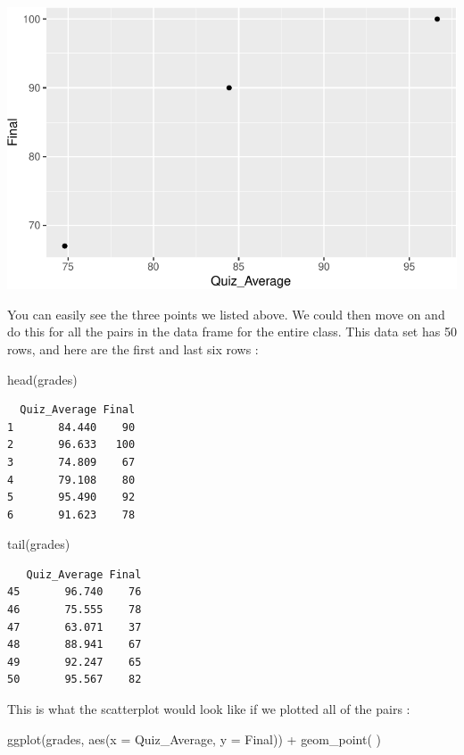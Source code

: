 \documentclass[
  letterpaper,
  DIV=11,
  numbers=noendperiod]{scrreprt}
\newenvironment{Shaded}{\begin{snugshade}}{\end{snugshade}}
\newcommand{\AttributeTok}[1]{\textcolor[rgb]{0.40,0.45,0.13}{#1}}
\newcommand{\FunctionTok}[1]{\textcolor[rgb]{0.28,0.35,0.67}{#1}}
\newcommand{\NormalTok}[1]{\textcolor[rgb]{0.00,0.23,0.31}{#1}}
\newcommand{\SpecialCharTok}[1]{\textcolor[rgb]{0.37,0.37,0.37}{#1}}
\begin{document}
\includegraphics{Scatterplots_and_Correlation_files/figure-pdf/unnamed-chunk-2-1.pdf}

You can easily see the three points we listed above. We could then move
on and do this for all the pairs in the data frame for the entire class.
This data set has 50 rows, and here are the first and last six rows :

\begin{Shaded}
\begin{Highlighting}[]
\FunctionTok{head}\NormalTok{(grades)}
\end{Highlighting}
\end{Shaded}

\begin{verbatim}
  Quiz_Average Final
1       84.440    90
2       96.633   100
3       74.809    67
4       79.108    80
5       95.490    92
6       91.623    78
\end{verbatim}

\begin{Shaded}
\begin{Highlighting}[]
\FunctionTok{tail}\NormalTok{(grades)}
\end{Highlighting}
\end{Shaded}

\begin{verbatim}
   Quiz_Average Final
45       96.740    76
46       75.555    78
47       63.071    37
48       88.941    67
49       92.247    65
50       95.567    82
\end{verbatim}

This is what the scatterplot would look like if we plotted all of the
pairs :

\begin{Shaded}
\begin{Highlighting}[]
\FunctionTok{ggplot}\NormalTok{(grades, }\FunctionTok{aes}\NormalTok{(}\AttributeTok{x =}\NormalTok{ Quiz\_Average, }\AttributeTok{y =}\NormalTok{ Final)) }\SpecialCharTok{+}
  \FunctionTok{geom\_point}\NormalTok{( )}
\end{Highlighting}
\end{Shaded}
\end{document}
